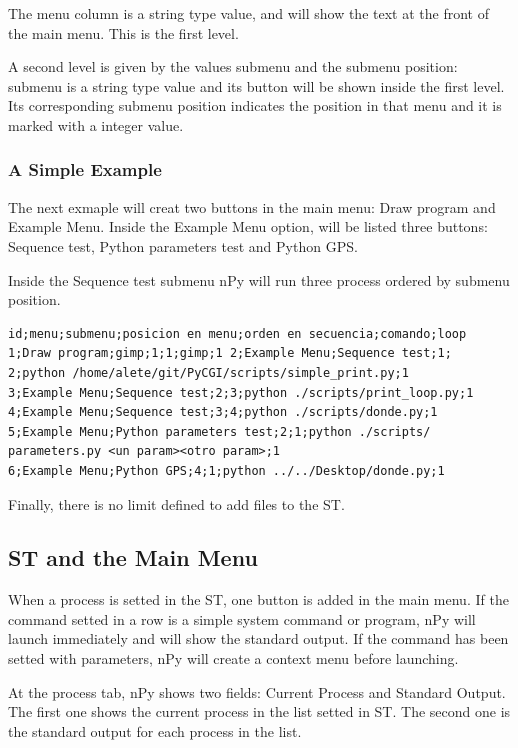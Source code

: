 \documentclass[a4paper,10pt]{article}
\begin{document}
The menu column is a string type value, and will show the text at the front of the main menu. This is the first level.

A second level is given by the values submenu and the submenu position: submenu is a string type value and its button will be shown inside the first level. Its corresponding submenu position indicates the position in that menu and it is marked with a integer value.

\subsubsection{A Simple Example}

The next exmaple will creat two buttons in the main menu: Draw program and Example Menu. Inside the Example Menu option, will be listed three buttons: Sequence test, Python parameters test and Python GPS.

Inside the Sequence test submenu nPy will run three process ordered by submenu position.

\begin{verbatim}
id;menu;submenu;posicion en menu;orden en secuencia;comando;loop 
1;Draw program;gimp;1;1;gimp;1 2;Example Menu;Sequence test;1;
2;python /home/alete/git/PyCGI/scripts/simple_print.py;1 
3;Example Menu;Sequence test;2;3;python ./scripts/print_loop.py;1 
4;Example Menu;Sequence test;3;4;python ./scripts/donde.py;1 
5;Example Menu;Python parameters test;2;1;python ./scripts/
parameters.py <un param><otro param>;1 
6;Example Menu;Python GPS;4;1;python ../../Desktop/donde.py;1
\end{verbatim}

Finally, there is no limit defined to add files to the ST.

\subsection{ST and the Main Menu}

When a process is setted in the ST, one button is added in the main menu. If the command setted in a row is a simple system command or program, nPy will launch immediately and will show the standard output. If the command has been setted with parameters, nPy will create a context menu before launching.

At the process tab, nPy shows two fields: Current Process and Standard Output. The first one shows the current process in the list setted in ST. The second one is the standard output for each process in the list.
\end{document}

